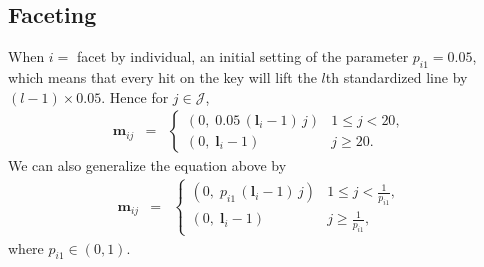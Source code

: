\documentclass[12pt]{article}
\begin{document}
\subsection{Faceting}


When $i=$ facet by individual, an initial setting of the
parameter $p_{i1}=0.05$, which means that every hit on the
key will lift the $l$th standardized line by $(l-1)\times0.05$.
Hence for $j\in\mathcal{J}$,
\begin{eqnarray*}
\mathbf{m}{}_{ij} & = & \begin{cases}
 (0,\;0.05\, (\mathbf{l}{}_i-1)\, j) & 1\leq j<20,\\
 (0,\; \mathbf{l}{}_i-1) & j\ge20.
\end{cases}
\end{eqnarray*}
We can also generalize the equation above by
\begin{eqnarray*}
\mathbf{m}{}_{ij} & = & \begin{cases}
 (0,\; p_{i1}\, (\mathbf{l}{}_i-1)\, j) & 1\leq j<\frac{1}{p_{i1}},\\
 (0,\; \mathbf{l}{}_i-1) & j\ge\frac{1}{p_{i1}},
\end{cases}
\end{eqnarray*}
where $p_{i1}\in (0,1)$.
\end{document}
